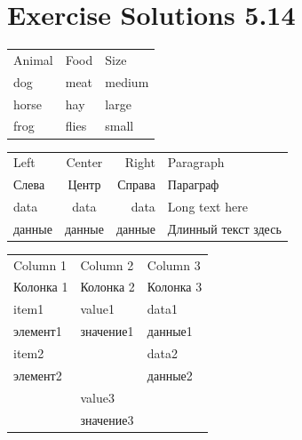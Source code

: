 \documentclass{article}
\begin{document}
\section*{Exercise Solutions 5.14}

\begin{center}
\begin{tabular}{lll}
    Animal & Food & Size \\
    dog & meat & medium \\
    horse & hay & large \\
    frog & flies & small \\
\end{tabular}
\end{center}

\begin{center}
\begin{tabular}{l c r p{2cm}}
\toprule
Left & Center & Right & Paragraph \\
Слева & Центр & Справа & Параграф \\
\midrule
data & data & data & Long text here \\
данные & данные & данные & Длинный текст здесь \\
\bottomrule
\end{tabular}
\end{center}

\begin{center}
\begin{tabular}{lll}
\toprule
Column 1 & Column 2 & Column 3 \\
Колонка 1 & Колонка 2 & Колонка 3 \\
\midrule
item1 & value1 & data1 \\
элемент1 & значение1 & данные1 \\
item2 &  & data2 \\
элемент2 &  & данные2 \\
 & value3 &  \\
 & значение3 &  \\
\bottomrule
\end{tabular}
\end{center}
\end{document}
